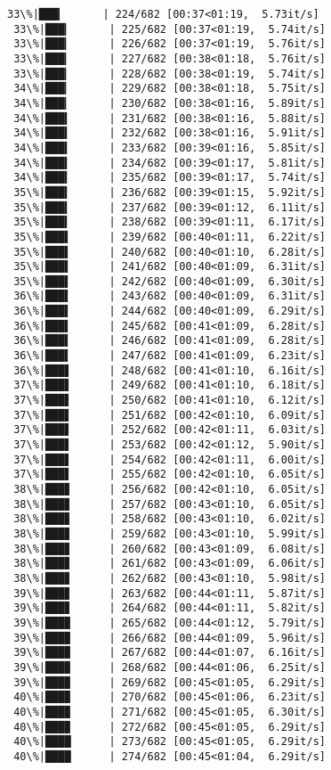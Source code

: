 \documentclass[11pt]{article}
\begin{document}
\begin{Verbatim}[commandchars=\\\{\}]
 33\%|███▎      | 224/682 [00:37<01:19,  5.73it/s]
 33\%|███▎      | 225/682 [00:37<01:19,  5.74it/s]
 33\%|███▎      | 226/682 [00:37<01:19,  5.76it/s]
 33\%|███▎      | 227/682 [00:38<01:18,  5.76it/s]
 33\%|███▎      | 228/682 [00:38<01:19,  5.74it/s]
 34\%|███▎      | 229/682 [00:38<01:18,  5.75it/s]
 34\%|███▎      | 230/682 [00:38<01:16,  5.89it/s]
 34\%|███▍      | 231/682 [00:38<01:16,  5.88it/s]
 34\%|███▍      | 232/682 [00:38<01:16,  5.91it/s]
 34\%|███▍      | 233/682 [00:39<01:16,  5.85it/s]
 34\%|███▍      | 234/682 [00:39<01:17,  5.81it/s]
 34\%|███▍      | 235/682 [00:39<01:17,  5.74it/s]
 35\%|███▍      | 236/682 [00:39<01:15,  5.92it/s]
 35\%|███▍      | 237/682 [00:39<01:12,  6.11it/s]
 35\%|███▍      | 238/682 [00:39<01:11,  6.17it/s]
 35\%|███▌      | 239/682 [00:40<01:11,  6.22it/s]
 35\%|███▌      | 240/682 [00:40<01:10,  6.28it/s]
 35\%|███▌      | 241/682 [00:40<01:09,  6.31it/s]
 35\%|███▌      | 242/682 [00:40<01:09,  6.30it/s]
 36\%|███▌      | 243/682 [00:40<01:09,  6.31it/s]
 36\%|███▌      | 244/682 [00:40<01:09,  6.29it/s]
 36\%|███▌      | 245/682 [00:41<01:09,  6.28it/s]
 36\%|███▌      | 246/682 [00:41<01:09,  6.28it/s]
 36\%|███▌      | 247/682 [00:41<01:09,  6.23it/s]
 36\%|███▋      | 248/682 [00:41<01:10,  6.16it/s]
 37\%|███▋      | 249/682 [00:41<01:10,  6.18it/s]
 37\%|███▋      | 250/682 [00:41<01:10,  6.12it/s]
 37\%|███▋      | 251/682 [00:42<01:10,  6.09it/s]
 37\%|███▋      | 252/682 [00:42<01:11,  6.03it/s]
 37\%|███▋      | 253/682 [00:42<01:12,  5.90it/s]
 37\%|███▋      | 254/682 [00:42<01:11,  6.00it/s]
 37\%|███▋      | 255/682 [00:42<01:10,  6.05it/s]
 38\%|███▊      | 256/682 [00:42<01:10,  6.05it/s]
 38\%|███▊      | 257/682 [00:43<01:10,  6.05it/s]
 38\%|███▊      | 258/682 [00:43<01:10,  6.02it/s]
 38\%|███▊      | 259/682 [00:43<01:10,  5.99it/s]
 38\%|███▊      | 260/682 [00:43<01:09,  6.08it/s]
 38\%|███▊      | 261/682 [00:43<01:09,  6.06it/s]
 38\%|███▊      | 262/682 [00:43<01:10,  5.98it/s]
 39\%|███▊      | 263/682 [00:44<01:11,  5.87it/s]
 39\%|███▊      | 264/682 [00:44<01:11,  5.82it/s]
 39\%|███▉      | 265/682 [00:44<01:12,  5.79it/s]
 39\%|███▉      | 266/682 [00:44<01:09,  5.96it/s]
 39\%|███▉      | 267/682 [00:44<01:07,  6.16it/s]
 39\%|███▉      | 268/682 [00:44<01:06,  6.25it/s]
 39\%|███▉      | 269/682 [00:45<01:05,  6.29it/s]
 40\%|███▉      | 270/682 [00:45<01:06,  6.23it/s]
 40\%|███▉      | 271/682 [00:45<01:05,  6.30it/s]
 40\%|███▉      | 272/682 [00:45<01:05,  6.29it/s]
 40\%|████      | 273/682 [00:45<01:05,  6.29it/s]
 40\%|████      | 274/682 [00:45<01:04,  6.29it/s]

\end{Verbatim}
\end{document}
